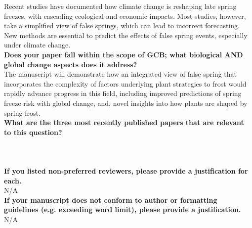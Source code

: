 \documentclass{article}\usepackage[]{graphicx}\usepackage[]{color}
\begin{document}
\noindent Recent studies have documented how climate change is reshaping late spring freezes, with cascading ecological and economic impacts. Most studies, however, take a simplified view of false springs, which can lead to incorrect forecasting. New methods are essential to predict the effects of false spring events, especially under climate change. \\

\noindent \textbf{ Does your paper fall within the scope of GCB; what biological AND global change aspects does it address?}\\

\noindent The manuscript will demonstrate how an integrated view of false spring that incorporates the complexity of factors underlying plant strategies to frost would rapidly advance progress in this field, including improved predictions of spring freeze risk with global change, and, novel insights into how plants are shaped by spring frost. \\ %

\noindent \textbf{What are the three most recently published papers that are relevant to this question?} \\

\\
\\
\\ %

\noindent \textbf{ If you listed non-preferred reviewers, please provide a justification for each.} \\

\noindent N/A \\

\noindent \textbf{ If your manuscript does not conform to author or formatting guidelines (e.g. exceeding word limit), please provide a justification.} \\

\noindent N/A \\



\end{document}
